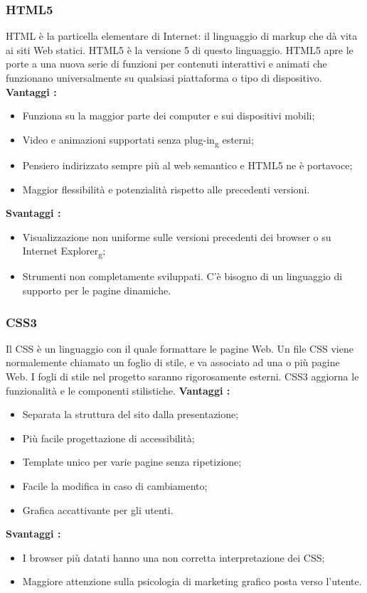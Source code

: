{		\subsubsection{HTML5}{
			HTML è la particella elementare di Internet: il linguaggio di markup che dà vita ai siti Web statici. HTML5 è la versione 5 di questo linguaggio. HTML5 apre le porte a una nuova serie di funzioni per contenuti interattivi e animati che funzionano universalmente su qualsiasi piattaforma o tipo di dispositivo.
			\textbf{Vantaggi :}
			\begin{itemize}\itemsep1pt
				\item Funziona su la maggior parte dei computer e sui dispositivi mobili;
				\item Video e animazioni supportati senza plug-in\textsubscript{g} esterni;
				\item Pensiero indirizzato sempre più al web semantico e HTML5 ne è portavoce;
				\item Maggior flessibilità e potenzialità rispetto alle precedenti versioni.
			\end{itemize}
			\textbf{Svantaggi :}
			\begin{itemize}\itemsep1pt
				\item Visualizzazione non uniforme sulle versioni precedenti dei browser o su Internet Explorer\textsubscript{g};
				\item Strumenti non completamente sviluppati. C'è bisogno di un linguaggio di supporto per le pagine dinamiche.
			\end{itemize}
		}
		\subsubsection{CSS3}{
			Il CSS è un linguaggio con il quale formattare le pagine Web. Un file CSS viene normalemente chiamato un foglio di stile, e va associato ad una o più pagine Web. I fogli di stile nel progetto saranno rigorosamente esterni. CSS3 aggiorna le funzionalità e le componenti stilistiche.
			\textbf{Vantaggi :}
			\begin{itemize}\itemsep1pt
				\item Separata la struttura del sito dalla presentazione;
				\item Più facile progettazione di accessibilità;
				\item Template unico per varie pagine senza ripetizione;
				\item Facile la modifica in caso di cambiamento;
				\item Grafica accattivante per gli utenti.
			\end{itemize}
			\textbf{Svantaggi :}
			\begin{itemize}\itemsep1pt
				\item I browser più datati hanno una non corretta interpretazione dei CSS;
				\item Maggiore attenzione sulla psicologia di marketing grafico posta verso l'utente.
			\end{itemize}
		}
}
